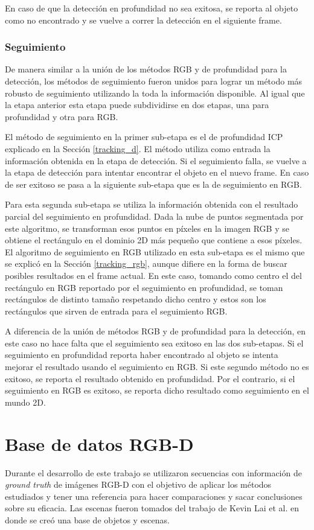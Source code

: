 En caso de que la detección en profundidad no sea exitosa, se reporta al objeto como no encontrado y se vuelve a correr la detección en el siguiente frame.


\subsection{Seguimiento}\label{tracking_rgbd}
De manera similar a la unión de los métodos RGB y de profundidad para la detección, los métodos de seguimiento fueron unidos para lograr un método más robusto de seguimiento utilizando la toda la información disponible. Al igual que la etapa anterior esta etapa puede subdividirse en dos etapas, una para profundidad y otra para RGB.

El método de seguimiento en la primer sub-etapa es el de profundidad ICP explicado en la Sección \ref{tracking_d}. El método utiliza como entrada la información obtenida en la etapa de detección. Si el seguimiento falla, se vuelve a la etapa de detección para intentar encontrar el objeto en el nuevo frame. En caso de ser exitoso se pasa a la siguiente sub-etapa que es la de seguimiento en RGB.

Para esta segunda sub-etapa se utiliza la información obtenida con el resultado parcial del seguimiento en profundidad. Dada la nube de puntos segmentada por este algoritmo, se transforman esos puntos en píxeles en la imagen RGB y se obtiene el rectángulo en el dominio 2D más pequeño que contiene a esos píxeles. El algoritmo de seguimiento en RGB utilizado en esta sub-etapa es el mismo que se explicó en la Sección \ref{tracking_rgb}, aunque difiere en la forma de buscar posibles resultados en el frame actual. En este caso, tomando como centro el del rectángulo en RGB reportado por el seguimiento en profundidad, se toman rectángulos de distinto tamaño respetando dicho centro y estos son los rectángulos que sirven de entrada para el seguimiento RGB.

A diferencia de la unión de métodos RGB y de profundidad para la detección, en este caso no hace falta que el seguimiento sea exitoso en las dos sub-etapas. Si el seguimiento en profundidad reporta haber encontrado al objeto se intenta mejorar el resultado usando el seguimiento en RGB. Si este segundo método no es exitoso, se reporta el resultado obtenido en profundidad. Por el contrario, si el seguimiento en RGB es exitoso, se reporta dicho resultado como seguimiento en el mundo 2D.




\chapter{Base de datos RGB-D}\label{base_rgbd}
Durante el desarrollo de este trabajo se utilizaron secuencias con información de \textit{ground truth} de imágenes RGB-D con el objetivo de aplicar los métodos estudiados y tener una referencia para hacer comparaciones y sacar conclusiones sobre su eficacia. Las escenas fueron tomados del trabajo de Kevin Lai et al. \cite{lai2011large} en donde se creó una base de objetos y escenas.

